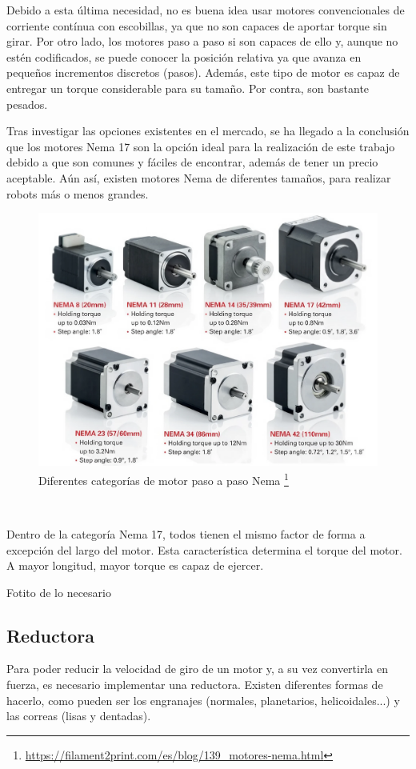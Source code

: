 Debido a esta última necesidad, no es buena idea usar motores convencionales de corriente contínua con escobillas, ya que no son 
capaces de aportar torque sin girar. Por otro lado, los motores paso a paso si son capaces de ello y, aunque no estén codificados,
se puede conocer la posición relativa ya que avanza en pequeños incrementos discretos (pasos). Además, este tipo de motor es capaz de 
entregar un torque considerable para su tamaño. Por contra, son bastante pesados. 

Tras investigar las opciones existentes en el mercado, se ha llegado a la conclusión que los motores Nema 17 son la opción ideal 
para la realización de este trabajo debido a que son comunes y fáciles de encontrar, además de tener un precio aceptable. Aún así, 
existen motores Nema de diferentes tamaños, para realizar robots más o menos grandes.
\begin{figure} [ht!]
  \begin{center}
    \includegraphics[width=15cm]{figs/MotorsNema.png}
  \end{center}
  \caption{Diferentes categorías de motor paso a paso Nema \footnote{\url{https://filament2print.com/es/blog/139_motores-nema.html}}}
  \label{fig:nema}
\end{figure}\ 

Dentro de la categoría Nema 17, todos tienen el mismo factor de forma a excepción del largo del motor. Esta característica determina 
el torque del motor. A mayor longitud, mayor torque es capaz de ejercer. 

Fotito de lo necesario

\subsection{Reductora}
Para poder reducir la velocidad de giro de un motor y, a su vez convertirla en fuerza, es necesario implementar una reductora. 
Existen diferentes formas de hacerlo, como pueden ser los engranajes (normales, planetarios, helicoidales...) y las correas (lisas y 
dentadas).

